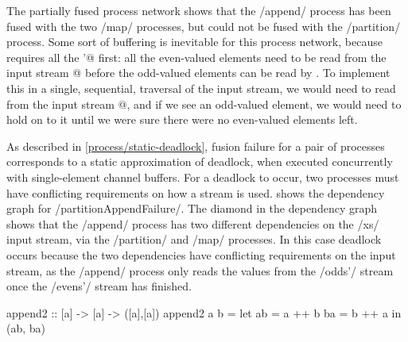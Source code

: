 The partially fused process network shows that the \Hs/append/ process has been fused with the two \Hs/map/ processes, but could not be fused with the \Hs/partition/ process.
Some sort of buffering is inevitable for this process network, because \Hs@append@ requires all the \Hs@evens'@ first: all the even-valued elements need to be read from the input stream @ before the odd-valued elements can be read by \Hs@append@.
To implement this in a single, sequential, traversal of the input stream, we would need to read from the input stream @, and if we see an odd-valued element, we would need to hold on to it until we were sure there were no even-valued elements left.


As described in \cref{process/static-deadlock}, fusion failure for a pair of processes corresponds to a static approximation of deadlock, when executed concurrently with single-element channel buffers.
For a deadlock to occur, two processes must have conflicting requirements on how a stream is used.
 shows the dependency graph for \Hs/partitionAppendFailure/.
The diamond in the dependency graph shows that the \Hs/append/ process has two different dependencies on the \Hs/xs/ input stream, via the \Hs/partition/ and \Hs/map/ processes.
In this case deadlock occurs because the two dependencies have conflicting requirements on the input stream, as the \Hs/append/ process only reads the values from the \Hs/odds'/ stream once the \Hs/evens'/ stream has finished.

\begin{haskell}[float,caption=List implementation of \Hs/append2/ program,label=l:bench:append2]
append2 :: [a] -> [a] -> ([a],[a])
append2 a b =
  let ab = a ++ b
      ba = b ++ a
  in  (ab, ba)
\end{haskell}

